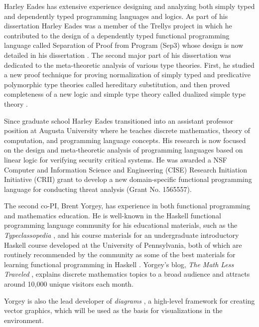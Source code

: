 Harley Eades has extensive experience designing and analyzing both
simply typed and dependently typed programming languages and
logics. As part of his dissertation Harley Eades was a member of the
Trellys project \cite{Kimmel:2013,Sjoberg:2012} in which he
contributed to the design of a dependently typed functional
programming language called Separation of Proof from Program (Sep3)
whose design is now detailed in his dissertation
\cite{Eades:2014b,Kimmel:2013}. The second major part of his
dissertation was dedicated to the meta-theoretic analysis of various
type theories. First, he studied a new proof technique for proving
normalization of simply typed and predicative polymorphic type
theories called hereditary substitution, and then proved completeness
of a new logic and simple type theory called dualized simple type
theory \cite{Eades:2014b}.

Since graduate school Harley Eades transitioned into an assistant
professor position at Augusta University where he teaches discrete
mathematics, theory of computation, and programming language
concepts. His research is now focused on the design and meta-theoretic
analysis of programming languages based on linear logic for verifying
security critical systems.  He was awarded a NSF Computer and
Information Science and Engineering (CISE) Research Initiation
Initiative (CRII) grant to develop a new domain-specific functional
programming language for conducting threat analysis (Grant
No. 1565557).

The second co-PI, Brent Yorgey, has experience in both functional
programming and mathematics education.  He is well-known in the
Haskell functional programming language community for his educational
materials, such as the \emph{Typeclassopedia} \cite{Typeclassopedia},
and his course materials for an undergraduate introductory Haskell
course developed at the University of Pennsylvania, both of which are
routinely recommended by the community as some of the best materials
for learning functional programming in Haskell \cite{bitemyapp-learn}.
Yorgey's blog, \emph{The Math Less Traveled} \cite{yorgey-tmlt}, explains
discrete mathematics topics to a broad audience and attracts around
10,000 unique visitors each month.

Yorgey is also the lead developer of \emph{diagrams} \cite{diagrams}, a
high-level framework for creating vector graphics, which will be used
as the basis for visualizations in the \thelang environment.
